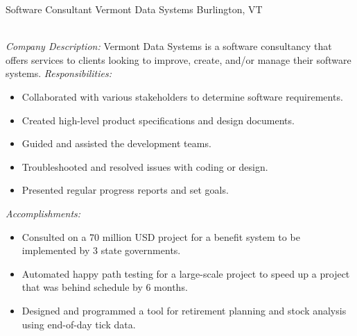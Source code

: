 \begin{samepage}
	{Software Consultant}
	{Vermont Data Systems}
	{Burlington, VT}{}
	{
		\emph{\\Company Description:}
		Vermont Data Systems is a software consultancy that offers services to
		clients looking to improve, create, and/or manage their software systems.
		\newline{}
		\newline{}
		\emph{Responsibilities:}
		\begin{itemize}
			\item Collaborated with various stakeholders to determine software requirements.
			\item Created high-level product specifications and design documents.
			\item Guided and assisted the development teams.
			\item Troubleshooted and resolved issues with coding or design.
			\item Presented regular progress reports and set goals.\\
		\end{itemize}
		\emph{Accomplishments:}
		\begin{itemize}
			\item Consulted on a 70 million USD project for a benefit system to be implemented by 3 state governments.
			\item Automated happy path testing for a large-scale project to speed up a project that was behind schedule by 6 months.
			\item Designed and programmed a tool for retirement planning and stock analysis using end-of-day tick data.\\
		\end{itemize}
	}
\end{samepage}
